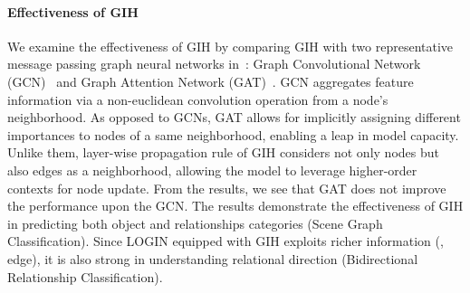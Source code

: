         \paragraph{Effectiveness of GIH}
            We examine the effectiveness of GIH by comparing GIH with two representative message passing graph neural networks in~: Graph Convolutional Network (GCN)~\cite{kipf2017semi} and Graph Attention Network (GAT)~\cite{velivckovic2018graph}.
            GCN aggregates feature information via a non-euclidean convolution operation from a node’s neighborhood.
            As opposed to GCNs, GAT allows for implicitly assigning different importances to nodes of a same neighborhood, enabling a leap in model capacity.
            Unlike them, layer-wise propagation rule of GIH considers not only nodes but also edges as a neighborhood, allowing the model to leverage higher-order contexts for node update.
            From the results, we see that GAT does not improve the performance upon the GCN.
            The results demonstrate the effectiveness of GIH in predicting both object and relationships categories (Scene Graph Classification). Since LOGIN equipped with GIH exploits richer information (\eg, edge), it is also strong in understanding relational direction (Bidirectional Relationship Classification).

        \begin{table}[t!]
            \captionsetup{font=footnotesize}
            \caption{
                \textbf{Per-type predicate classification results.} Only top-20 frequent predicates are shown. The evaluation metric is \textit{R@50}.
            }
            \centering
            \label{tab:top20}
        \end{table}

